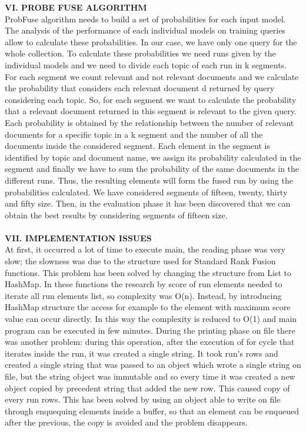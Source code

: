 \documentclass[12pt,journal]{IEEEtran}
\begin{document}
\textbf{VI.	PROBE FUSE ALGORITHM} \\
ProbFuse algorithm needs to build a set of probabilities for each input model. 
The analysis of the performance of each individual models on training queries allow to calculate these probabilities. 
In our case, we have only one query for the whole collection.
To calculate these probabilities we need runs given by the individual models and we need to divide each topic of each run in k segments. For each segment we count relevant and not relevant documents and we calculate the probability that considers each relevant document d returned by query considering each topic. 
So, for each segment we want to calculate the probability that a relevant document returned in this segment is relevant to the given query. Each probability is obtained by the relationship between the number of relevant documents for a specific topic in a k segment and the number of all the documents inside the considered segment.
Each element in the segment is identified by topic and document name, we assign its probability calculated in the segment and finally we have to sum the probability of the same documents in the different runs.
Thus, the resulting elements will form the fused run by using the probabilities calculated. 
We have considered segments of fifteen, twenty, thirty and fifty size. Then, in the evaluation phase it has been discovered that we can obtain the best results by considering segments of fifteen size. \\ \\
\textbf{VII. IMPLEMENTATION ISSUES} \\
At first, it occurred a lot of time to execute main, the reading phase was very slow; the slowness was due to the structure used for Standard Rank Fusion functions. This problem has been solved by changing the structure from List to HashMap. 
In these functions the research by score of run elements needed to iterate all run elements list, so complexity was O(n). Instead, by introducing HashMap structure the access for example to the element with maximum score value can occur directly. In this way the complexity is reduced to O(1) and main program can be executed in few minutes. 
During the printing phase on file there was another problem: during this operation, after the execution of for cycle that iterates inside the run, it was created a single string. It took run’s rows and created a single string that was passed to an object which wrote a single string on file, but the string object was immutable and so every time it was created a new object copied by precedent string that added the new row. This caused copy of every run rows. This has been solved by using an object able to write on file through enquequing elements inside a buffer, so that an element can be enqueued after the previous, the copy is avoided and the problem disappears. \\
\end{document}
